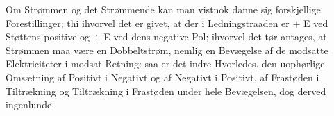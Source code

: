 \documentclass[12pt,a4paper]{book}
\begin{document}
Om Strømmen og det Strømmende kan man vistnok danne sig forskjellige
Forestillinger; thi ihvorvel det er givet, at der i Ledningstraaden er
$+$ E ved Støttens positive og $\div$ E ved dens negative Pol;
ihvorvel det tør antages, at Strømmen maa være en Dobbeltstrøm, nemlig
en Bevægelse af de modsatte Elektriciteter i modsat Retning: saa er
det indre Hvorledes. den uophørlige Omsætning af Positivt i Negativt
og af Negativt i Positivt, af Frastøden i Tiltrækning og Tiltrækning i
Frastøden under hele Bevægelsen, dog derved ingenlunde
\end{document}

